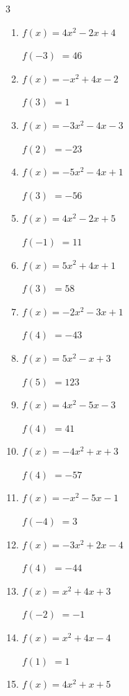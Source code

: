 \begin{multicols}{3}
\begin{enumerate}
$f(-3)$
        $= -37$

\columnbreak %

\resetques

  \item $f(x)=4x^{2}-2x+4$

$f(-3)$
        $= 46$

  \item $f(x)=-x^{2}+4x-2$

$f(3)$
        $= 1$

  \item $f(x)=-3x^{2}-4x-3$

$f(2)$
        $= -23$

  \item $f(x)=-5x^{2}-4x+1$

$f(3)$
        $= -56$

  \item $f(x)=4x^{2}-2x+5$

$f(-1)$
        $= 11$

  \item $f(x)=5x^{2}+4x+1$

$f(3)$
        $= 58$

  \item $f(x)=-2x^{2}-3x+1$

$f(4)$
        $= -43$

  \item $f(x)=5x^{2}-x+3$

$f(5)$
        $= 123$

  \item $f(x)=4x^{2}-5x-3$

$f(4)$
        $= 41$

  \item $f(x)=-4x^{2}+x+3$

$f(4)$
        $= -57$

  \item $f(x)=-x^{2}-5x-1$

$f(-4)$
        $= 3$

  \item $f(x)=-3x^{2}+2x-4$

$f(4)$
        $= -44$

  \item $f(x)=x^{2}+4x+3$

$f(-2)$
        $= -1$

  \item $f(x)=x^{2}+4x-4$

$f(1)$
        $= 1$

  \item $f(x)=4x^{2}+x+5$


\end{enumerate}
\end{multicols}

